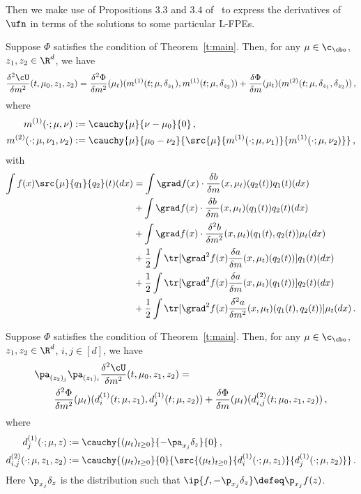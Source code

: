 \documentclass{amsart}
\begin{document}
Then we make use of Propositions 3.3 and 3.4 of~\cite{DelarueTse2021} to express the derivatives of $\ufn$ in terms of the solutions to some particular L-FPEs. 
\begin{lemma}
	\label{l:decomp-into-m}
    Suppose $\Phi$ satisfies the condition of Theorem~\ref{t:main}. 
    Then, for any $\mu \in \c_\cbo$, $z_1, z_2 \in \R^d$, we have 
    \begin{equation*}
	\frac{\delta^2 \cU}{\delta m^2} (t,\mu_0,z_1,z_2) = \frac{\delta^2 \Phi}{\delta m^2} (\mu_t) (m^{(1)}(t;\mu,\delta_{z_1}), m^{(1)}(t;\mu,\delta_{z_2})) + \frac{\delta \Phi}{\delta m} (\mu_t) (m^{(2)}(t;\mu,\delta_{z_1}, \delta_{z_2})) \,,
    \end{equation*}
	where 
	\begin{align*}
		m^{(1)}(\cdot;\mu,\nu) & := \cauchy{\mu}{\nu-\mu_0}{0} \,, \\
		m^{(2)}(\cdot;\mu,\nu_1,\nu_2) & := \cauchy{\mu}{\mu_0-\nu_2}{\src{\mu}{m^{(1)}(\cdot;\mu,\nu_1)}{m^{(1)}(\cdot;\mu,\nu_2)} } \,,
	\end{align*}
	with 
	\begin{align*}
		\int f(x) \src{\mu}{q_1}{q_2}(t) (dx) & = \int \grad f(x) \cdot \frac{\delta b}{\delta m}(x,\mu_t)(q_2(t)) q_1(t)(dx) \\
		& + \int \grad f(x) \cdot \frac{\delta b}{\delta m}(x,\mu_t)(q_1(t)) q_2(t)(dx) \\
		& + \int \grad f(x) \cdot \frac{\delta^2 b}{\delta m^2}(x,\mu_t)(q_1(t),q_2(t)) \mu_t(dx) \\
		& + \frac{1}{2} \int \tr[ \grad^2 f(x) \frac{\delta a}{\delta m}(x,\mu_t)(q_2(t)) ] q_1(t)(dx) \\
		& + \frac{1}{2} \int \tr[ \grad^2 f(x) \frac{\delta a}{\delta m}(x,\mu_t)(q_1(t)) ] q_2(t)(dx) \\
		& + \frac{1}{2} \int \tr[ \grad^2 f(x) \frac{\delta^2 a}{\delta m^2}(x,\mu_t)(q_1(t),q_2(t)) ] \mu_t(dx) \,.
	\end{align*}
\end{lemma}

\begin{lemma}
	\label{l:decomp-into-d}
	Suppose $\Phi$ satisfies the condition of Theorem~\ref{t:main}. 
    Then, for any $\mu \in \c_\cbo$, $z_1, z_2 \in \R^d$, $i,j \in [d]$, we have 
    \begin{align*}
        & \pa_{(z_2)_j} \pa_{(z_1)_i} \frac{\delta^2 \cU}{\delta m^2} (t,\mu_0,z_1,z_2) = \\
		& \qquad \frac{\delta^2 \Phi}{\delta m^2} (\mu_t) (d^{(1)}_i(t;\mu,{z_1}), d^{(1)}_j(t;\mu,{z_2})) + \frac{\delta \Phi}{\delta m} (\mu_t) (d^{(2)}_{i,j}(t;\mu_0,{z_1}, {z_2}))  \,,
    \end{align*}
	where 
	\begin{align*}
		d^{(1)}_j (\cdot; \mu,z) & := \cauchy{(\mu_t)_{t \ge 0}}{-\pa_{x_j} \delta_z}{0} \,, \\
		d^{(2)}_{i,j} (\cdot; \mu,z_1,z_2) & := \cauchy{(\mu_t)_{t \ge 0}}{0}{\src{(\mu_t)_{t \ge 0}}{d^{(1)}_i(\cdot;\mu,z_1)}{d^{(1)}_j(\cdot;\mu,z_2)}} \,.
	\end{align*}
	Here $\p_{x_j} \delta_z$ is the distribution such that $\ip{f, -\p_{x_j} \delta_z} \defeq \p_{x_j}f(z)$. 
\end{lemma}
\end{document}
